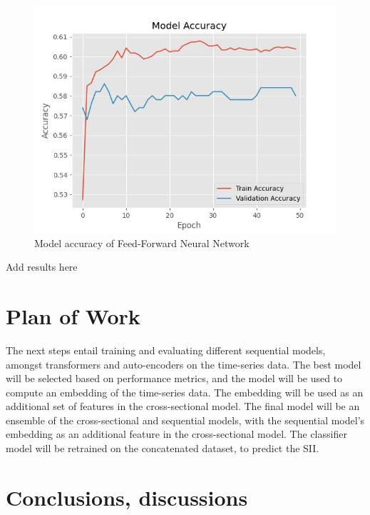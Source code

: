 \documentclass[11pt]{extarticle}
\newcommand{\todo}{\textcolor{red}{TODO:}~}
\begin{document}
\begin{figure}[h!]
    \centering
    \includegraphics[scale=0.8]{"./images/model_accuracy.jpg"}
    \caption{Model accuracy of Feed-Forward Neural Network}
\end{figure}


\begin{mdframed}
    Add results here
\end{mdframed}

\section{Plan of Work} 

The next steps entail training and evaluating different sequential models, amongst transformers and auto-encoders on the time-series data. The best model will be selected based on performance metrics, and the model will be used to compute an embedding of the time-series data. The embedding will be used as an additional set of features in the cross-sectional model. The final model will be an ensemble of the cross-sectional and sequential models, with the sequential model's embedding as an additional feature in the cross-sectional model. The classifier model will be retrained on the concatenated dataset, to predict the SII.

\section{Conclusions, discussions}
\end{document}
